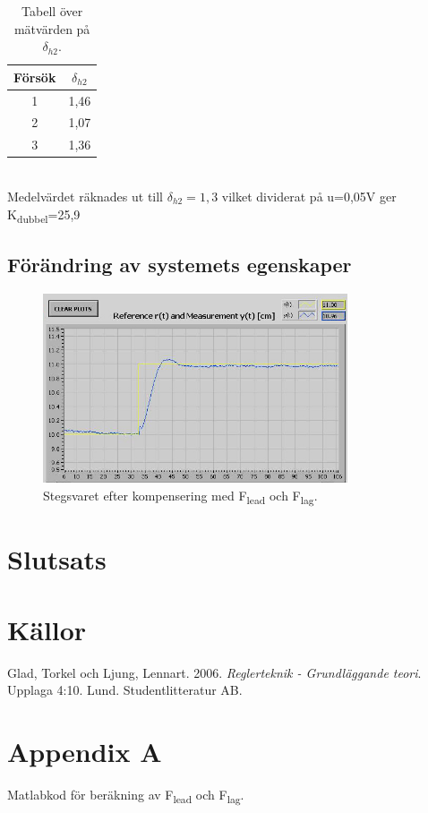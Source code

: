 \documentclass{article}
\begin{document}
\begin{table}[ht] 
\centering 
\begin{tabular}{c c} 
Försök & $\delta_{h2}$ \\ [0.5ex] %
\hline
1 & 1,46 \\
2 & 1,07 \\
3 & 1,36 \\

\end{tabular} 
\caption{Tabell över mätvärden på $\delta_{h2}$.}
\end{table}
~\\ %
Medelvärdet räknades ut till $\delta_{h2}=1,3$ vilket dividerat på u=0,05V ger K\textsubscript{dubbel}=25,9
\newpage

\subsection{Förändring av systemets egenskaper}

\begin{figure}[ht!]
\centering
\includegraphics[width=90mm]{Test1_cut.jpg}
\caption{Stegsvaret efter kompensering med F\textsubscript{lead} och F\textsubscript{lag}.}
\label{overflow}
\end{figure}


\newpage
\section{Slutsats}
\newpage


\section{Källor}
Glad, Torkel och Ljung, Lennart. 2006. \textit{Reglerteknik - Grundläggande teori}. Upplaga 4:10. Lund. Studentlitteratur AB.
\newpage


\section{Appendix A}
Matlabkod för beräkning av F\textsubscript{lead} och F\textsubscript{lag}.

\end{document}
